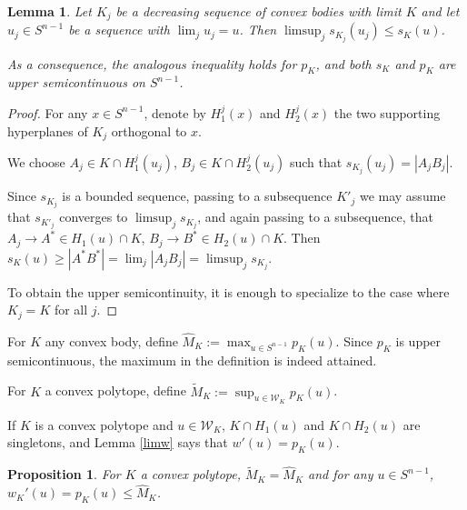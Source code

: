 \documentclass[a4paper,12pt]{amsart}
\newtheorem{prop}[thm]{Proposition}
\newtheorem{lemma}[thm]{Lemma}
\begin{document}
\begin{lemma}
\label{pusc} Let $K_j$ be a decreasing sequence of convex bodies
with limit $K$ and let $u_j \in S^{n-1}$ be a sequence with
$\lim_j u_j = u$. Then $\limsup_j s_{K_j} (u_j) \le s_K(u)$.

As a consequence, the analogous inequality holds for $p_K$,
and both $s_K$ and $p_K$ are upper semicontinuous on $S^{n-1}$.
\end{lemma}

\begin{proof}
For any $x \in S^{n-1}$,
denote by $H^j_1(x)$ and $H^j_2(x)$ the two supporting hyperplanes of $K_j$ orthogonal to $x$.

We choose $A_j \in K\cap H^j_1(u_j)$, $B_j \in K\cap H^j_2(u_j)$
such that $s_{K_j} (u_j) = |A_j B_j|$.

Since $s_{K_j}$ is a bounded sequence, passing to a subsequence
$K'_j$ we may assume that $s_{K'_j}$ converges to $\limsup_j
s_{K_j}$, and again passing to a subsequence, that $A_j\to A^* \in
H_1(u)\cap K$, $B_j\to B^* \in H_2(u)\cap K$. Then $s_K(u)\ge
|A^*B^*| =\lim_j |A_jB_j| = \limsup_j s_{K_j}$.

To obtain the upper semicontinuity, it is enough to specialize
to the case where $K_j=K$ for all $j$.
\end{proof}

For $K$ any convex body, define
$\hat M_K:=\max_{u\in S^{n-1}}p_K(u)$.
Since $p_K$ is upper semicontinuous,  the maximum in the
definition is indeed attained.

For $K$  a convex polytope, define
$ \tilde M_K:=\sup_{u\in \mathcal W_K}p_K(u)$.

If $K$ is a convex polytope and $u \in \mathcal W_K$, $K\cap H_1(u)$ and $K\cap H_2(u)$
are singletons, and Lemma  \ref{limw} says that $w'(u)=p_K(u)$.

\begin{prop}
\label{nongen}
For $K$ a convex polytope, $ \tilde M_K=\hat M_K$ and
for any $u\in S^{n-1}$, $w_K'(u)= p_K(u) \le \hat M_K$.
\end{prop}
\end{document}
